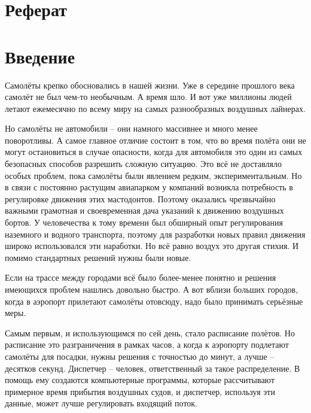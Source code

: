 \documentclass[12pt, a4 paper]{article}
\theoremstyle{plain}
\begin{document}

\section*{Реферат}

\pagestyle{empty} %

\newpage


\tableofcontents

\newpage


\setcounter{page}{4}

\section*{Введение}
\pagestyle{plain} %

Самолёты крепко обосновались в нашей жизни. Уже в середине прошлого века самолёт не был чем-то необычным. А время шло. И вот уже миллионы людей летают ежемесячно по всему миру на самых разнообразных воздушных лайнерах.

Но самолёты не автомобили – они намного массивнее и много менее поворотливы. А самое главное отличие состоит в том, что во время полёта они не могут остановиться в случае опасности, когда для автомобиля это один из самых безопасных способов разрешить сложную ситуацию. Это всё не доставляло особых проблем, пока самолёты были явлением редким, экспериментальным. Но в связи с постоянно растущим авиапарком у компаний возникла потребность в регулировке движения этих мастодонтов. Поэтому оказались чрезвычайно важными грамотная и своевременная дача указаний к движению воздушных бортов. У человечества к тому времени был обширный опыт регулирования наземного и водного транспорта, поэтому для разработки новых правил движения широко использовался эти наработки. Но всё равно воздух это другая стихия. И помимо стандартных решений нужны были новые.

Если на трассе между городами всё было более-менее понятно и решения имеющихся проблем нашлись довольно быстро. А вот вблизи больших городов, когда в аэропорт прилетают самолёты отовсюду, надо было принимать серьёзные меры.

Самым первым, и использующимся по сей день, стало расписание полётов. Но расписание это разграничения в рамках часов, а когда к аэропорту подлетают самолёты для посадки, нужны решения с точностью до минут, а лучше – десятков секунд. Диспетчер – человек, ответственный за такое распределение.  В помощь ему создаются компьютерные программы, которые рассчитывают примерное время прибытия воздушных судов, и диспетчер, используя эти данные, может лучше регулировать входящий поток.
\end{document}
